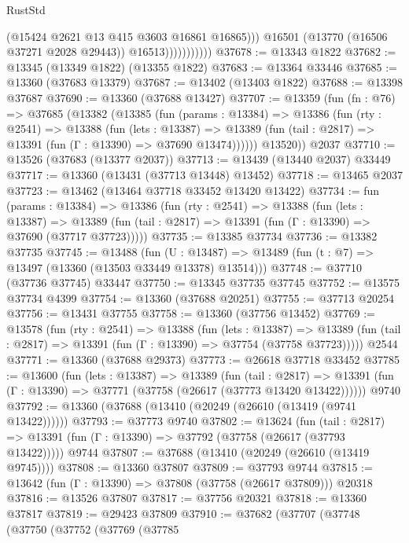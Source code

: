 \begin{lexlean}{RustStd}
\begin{coremodule}
                              (@15424 @2621 @13 @415 @3603 @16861 @16865)))
                          @16501
                          (@13770 (@16506 @37271 @2028 @29443))
                          @16513)))))))))))
@37678 := @13343 @1822
@37682 := @13345 (@13349 @1822) (@13355 @1822)
@37683 := @13364 @33446
@37685 := @13360 (@37683 @13379)
@37687 := @13402 (@13403 @1822)
@37688 := @13398 @37687
@37690 := @13360 (@37688 @13427)
@37707 := @13359
    (fun (fn : @76) =>
    @37685
      (@13382
        (@13385
          (fun (params : @13384) =>
          @13386
            (fun (rty : @2541) =>
            @13388
              (fun (lets : @13387) =>
              @13389 (fun (tail : @2817) => @13391 (fun (Γ : @13390) => @37690 @13474))))))
        @13520))
    @2037
@37710 := @13526 (@37683 (@13377 @2037))
@37713 := @13439 (@13440 @2037) @33449
@37717 := @13360 (@13431 (@37713 @13448) @13452)
@37718 := @13465 @2037
@37723 := @13462 (@13464 @37718 @33452 @13420 @13422)
@37734 := fun (params : @13384) =>
  @13386
    (fun (rty : @2541) =>
    @13388
      (fun (lets : @13387) =>
      @13389 (fun (tail : @2817) => @13391 (fun (Γ : @13390) => @37690 (@37717 @37723)))))
@37735 := @13385 @37734
@37736 := @13382 @37735
@37745 := @13488
    (fun (U : @13487) => @13489 (fun (t : @7) => @13497 (@13360 (@13503 @33449 @13378) @13514)))
@37748 := @37710 (@37736 @37745) @33447
@37750 := @13345 @37735 @37745
@37752 := @13575 @37734 @4399
@37754 := @13360 (@37688 @20251)
@37755 := @37713 @20254
@37756 := @13431 @37755
@37758 := @13360 (@37756 @13452)
@37769 := @13578
    (fun (rty : @2541) =>
    @13388
      (fun (lets : @13387) =>
      @13389 (fun (tail : @2817) => @13391 (fun (Γ : @13390) => @37754 (@37758 @37723)))))
    @2544
@37771 := @13360 (@37688 @29373)
@37773 := @26618 @37718 @33452
@37785 := @13600
    (fun (lets : @13387) =>
    @13389
      (fun (tail : @2817) =>
      @13391 (fun (Γ : @13390) => @37771 (@37758 (@26617 (@37773 @13420 @13422))))))
    @9740
@37792 := @13360 (@37688 (@13410 (@20249 (@26610 (@13419 (@9741 @13422))))))
@37793 := @37773 @9740
@37802 := @13624
    (fun (tail : @2817) => @13391 (fun (Γ : @13390) => @37792 (@37758 (@26617 (@37793 @13422)))))
    @9744
@37807 := @37688 (@13410 (@20249 (@26610 (@13419 @9745))))
@37808 := @13360 @37807
@37809 := @37793 @9744
@37815 := @13642 (fun (Γ : @13390) => @37808 (@37758 (@26617 @37809))) @20318
@37816 := @13526 @37807
@37817 := @37756 @20321
@37818 := @13360 @37817
@37819 := @29423 @37809
@37910 := @37682
    (@37707
      (@37748
        (@37750
          (@37752
            (@37769
              (@37785

\end{coremodule}
\end{lexlean}

